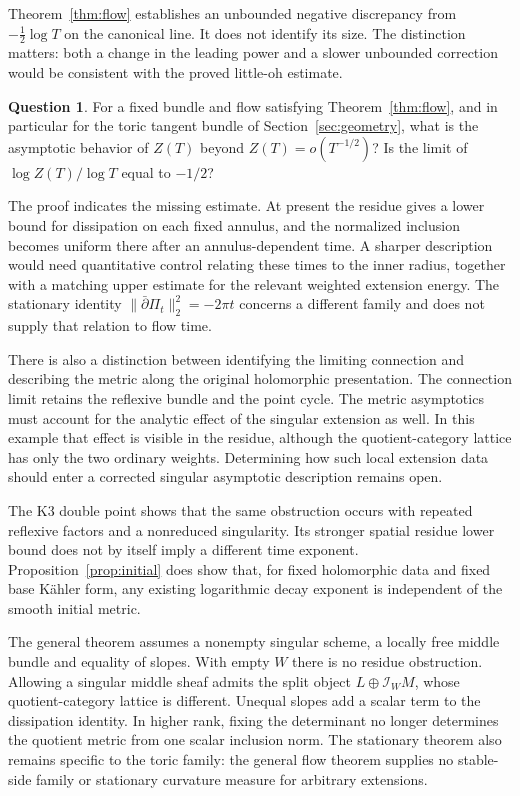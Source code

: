 \documentclass[11pt]{amsart}
\theoremstyle{definition}
\newtheorem{question}[theorem]{Question}
\theoremstyle{remark}
\newcommand{\cI}{\mathcal I}
\newcommand{\db}{\bar\partial}
\begin{document}
Theorem~\ref{thm:flow} establishes an unbounded negative discrepancy
from $-\tfrac12\log T$ on the canonical line. It does not identify
its size. The distinction matters: both a change in the leading power
and a slower unbounded correction would be consistent with the proved
little-oh estimate.

\begin{question}\label{question:sharp-rate}
For a fixed bundle and flow satisfying Theorem~\ref{thm:flow}, and in
particular for the toric tangent bundle of Section~\ref{sec:geometry},
what is the asymptotic
behavior of $Z(T)$ beyond $Z(T)=o(T^{-1/2})$? Is the limit of
$\log Z(T)/\log T$ equal to $-1/2$?
\end{question}

The proof indicates the missing estimate. At present the residue gives
a lower bound for dissipation on each fixed annulus, and the normalized
inclusion becomes uniform there after an annulus-dependent time.
A sharper description would need quantitative control relating these
times to the inner radius, together with a matching upper estimate for
the relevant weighted extension energy. The stationary identity
$\|\db\Pi_t\|_2^2=-2\pi t$ concerns a different family and does not
supply that relation to flow time.

There is also a distinction between identifying the limiting connection
and describing the metric along the original holomorphic presentation.
The connection limit retains the reflexive bundle and the point cycle.
The metric asymptotics must account for the analytic effect of the
singular extension as well. In this example that effect is visible in
the residue, although the quotient-category lattice has only the two
ordinary weights. Determining how such local extension data should
enter a corrected singular asymptotic description remains open.

The K3 double point shows that the same obstruction occurs with repeated
reflexive factors and a nonreduced singularity. Its stronger spatial
residue lower bound does not by itself imply a different time exponent.
Proposition~\ref{prop:initial} does show that, for fixed holomorphic data
and fixed base K\"ahler form, any existing logarithmic decay exponent is
independent of the smooth initial metric.

The general theorem assumes a nonempty singular scheme, a locally free
middle bundle and equality of slopes. With empty $W$ there is no residue
obstruction. Allowing a singular middle sheaf admits the split object
$L\oplus\cI_WM$, whose quotient-category lattice is different. Unequal
slopes add a scalar term to the dissipation identity. In higher rank,
fixing the determinant no longer determines the quotient metric from
one scalar inclusion norm. The stationary theorem also remains specific
to the toric family: the general flow theorem supplies no stable-side
family or stationary curvature measure for arbitrary extensions.
\end{document}
